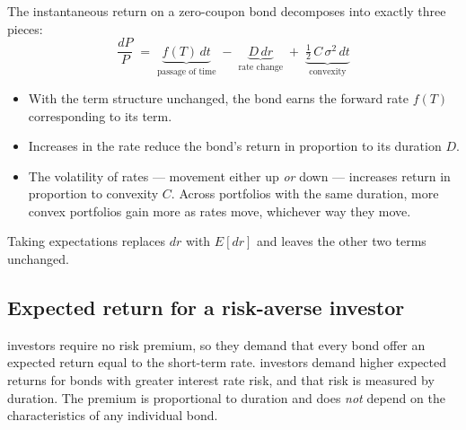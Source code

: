 
\noindent\gapbadge{}\par
\vspace{6pt}

\begin{mrgapbox}[title={The three components of bond return}]
The instantaneous return on a zero-coupon bond decomposes into exactly three pieces:
\[ \frac{dP}{P} \;=\; \underbrace{f(T)\,dt}_{\text{passage of time}}
   \;-\; \underbrace{D\,dr}_{\text{rate change}}
   \;+\; \underbrace{\tfrac{1}{2}\,C\,\sigma^{2}\,dt}_{\text{convexity}} \]
\begin{itemize}
\item {} With the term structure unchanged, the bond earns the forward rate
      $f(T)$ corresponding to its term.
\item {} Increases in the rate reduce the bond's return in proportion to its
      duration $D$.
\item {} The volatility of rates --- movement either up \textit{or} down ---
      increases return in proportion to convexity $C$. Across portfolios with the same duration,
      more convex portfolios gain more as rates move, whichever way they move.
\end{itemize}
Taking expectations replaces $dr$ with $E[dr]$ and leaves the other two terms unchanged.
\end{mrgapbox}

\subsection{Expected return for a risk-averse investor}

\begin{mrgapbox}[title={Risk-neutral versus risk-averse}]
 investors require no risk premium, so they demand that every bond offer an
expected return equal to the short-term rate.  investors demand higher
expected returns for bonds with greater interest rate risk, and that risk is measured by
duration. The premium is proportional to duration and does \textit{not} depend on the
characteristics of any individual bond.
\end{mrgapbox}

